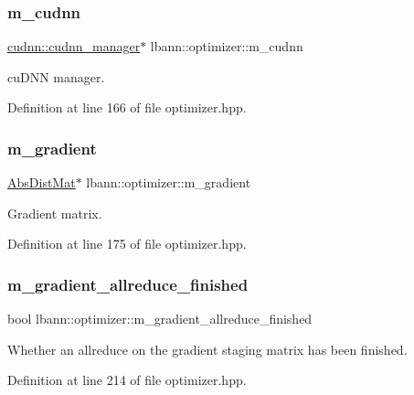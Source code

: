 \subsubsection{\texorpdfstring{m\+\_\+cudnn}{m\_cudnn}}
{\footnotesize\ttfamily \hyperlink{classlbann_1_1cudnn_1_1cudnn__manager}{cudnn\+::cudnn\+\_\+manager}$\ast$ lbann\+::optimizer\+::m\+\_\+cudnn\hspace{0.3cm}{\ttfamily [protected]}}

cu\+D\+NN manager. 

Definition at line 166 of file optimizer.\+hpp.

\mbox{\label{classlbann_1_1optimizer_a3df20cb0ae2b60430ad4fd235d66c12e}} 
\subsubsection{\texorpdfstring{m\+\_\+gradient}{m\_gradient}}
{\footnotesize\ttfamily \hyperlink{base_8hpp_a9a697a504ae84010e7439ffec862b470}{Abs\+Dist\+Mat}$\ast$ lbann\+::optimizer\+::m\+\_\+gradient\hspace{0.3cm}{\ttfamily [protected]}}

Gradient matrix. 

Definition at line 175 of file optimizer.\+hpp.

\mbox{\label{classlbann_1_1optimizer_a4d332551d05e245ad3f862653b5af65a}} 
\subsubsection{\texorpdfstring{m\+\_\+gradient\+\_\+allreduce\+\_\+finished}{m\_gradient\_allreduce\_finished}}
{\footnotesize\ttfamily bool lbann\+::optimizer\+::m\+\_\+gradient\+\_\+allreduce\+\_\+finished\hspace{0.3cm}{\ttfamily [private]}}

Whether an allreduce on the gradient staging matrix has been finished. 

Definition at line 214 of file optimizer.\+hpp.

